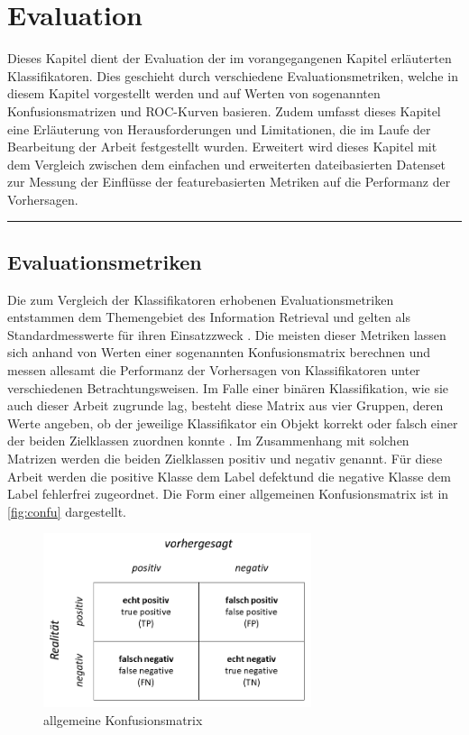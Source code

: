 
\chapter{Evaluation}
\label{evaluation}

Dieses Kapitel dient der Evaluation der im vorangegangenen Kapitel erläuterten Klassifikatoren. Dies geschieht durch verschiedene Evaluationsmetriken, welche in diesem Kapitel vorgestellt werden und auf Werten von sogenannten Konfusionsmatrizen und ROC-Kurven basieren. Zudem umfasst dieses Kapitel eine Erläuterung von Herausforderungen und Limitationen, die im Laufe der Bearbeitung der Arbeit festgestellt wurden. Erweitert wird dieses Kapitel mit dem Vergleich zwischen dem \glqq einfachen\grqq{} und erweiterten dateibasierten Datenset zur Messung der Einflüsse der featurebasierten Metriken auf die Performanz der Vorhersagen. 
\\
\hrule



\section{Evaluationsmetriken}
\label{eval-metrics}

Die zum Vergleich der Klassifikatoren erhobenen Evaluationsmetriken entstammen dem Themengebiet des Information Retrieval und gelten als Standardmesswerte für ihren Einsatzzweck \cite{Sammut2017}. Die meisten dieser Metriken lassen sich anhand von Werten einer sogenannten Konfusionsmatrix berechnen und messen allesamt die Performanz der Vorhersagen von Klassifikatoren unter verschiedenen Betrachtungsweisen. Im Falle einer binären Klassifikation,  wie sie auch dieser Arbeit zugrunde lag, besteht diese Matrix aus vier Gruppen, deren Werte angeben, ob der jeweilige Klassifikator ein Objekt korrekt oder falsch einer der beiden Zielklassen zuordnen konnte \cite{Sammut2017}. Im Zusammenhang mit solchen Matrizen werden die beiden Zielklassen \glqq positiv\grqq{} und \glqq negativ\grqq{} genannt. Für diese Arbeit werden die positive Klasse dem Label \glqq defekt\grqq und die negative Klasse dem Label \glqq fehlerfrei\grqq{} zugeordnet. Die Form einer allgemeinen Konfusionsmatrix ist in \autoref{fig:confu} dargestellt.

\begin{figure}[H]
    \centering
    \includegraphics[width=0.7\textwidth]{images/Confusion}
    \caption{allgemeine Konfusionsmatrix\label{fig:confu}}
\end{figure}

